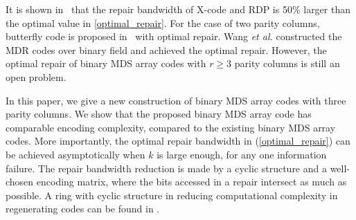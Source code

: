 \documentclass[conference]{IEEEtran}
\begin{document}
It is shown in~\cite{xu2014single,xiang2010optimal} that the repair bandwidth of X-code and RDP is 50\% larger than the optimal value in \eqref{optimal_repair}.
For the case of two parity columns, butterfly code is proposed in~\cite{En2013Repair} with optimal repair. Wang \emph{et al.} \cite{Wang2013MDR,Wang2016Two} constructed the MDR codes over binary field and achieved the optimal repair. However, the optimal repair of binary MDS array codes with $r\geq 3$ parity columns is still an open problem.


In this paper, we give a new construction of binary MDS array codes with three parity columns. We show that the proposed binary MDS array code has comparable encoding complexity, compared to the existing binary MDS array codes. More importantly, the optimal repair bandwidth in (\ref{optimal_repair}) can be achieved asymptotically when $k$ is large enough, for any one information failure. 
The repair bandwidth reduction is made by a cyclic structure and a well-chosen encoding matrix, where the bits accessed in a repair intersect as much as possible. A ring with cyclic structure in reducing computational complexity in regenerating codes can be found in \cite{shumregenerating,Hou2016BASIC}. 
\end{document}
